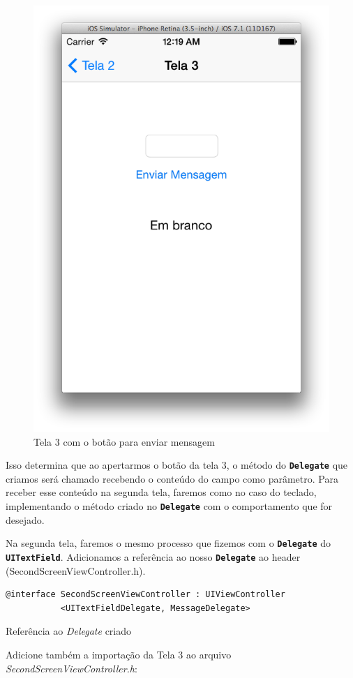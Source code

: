 \documentclass[a4paper,12pt,brazil,doubleside]{book}
\begin{document}
\begin{singlespace}
\bigskip
\bigskip

\begin{figure}[H]
  \centering
  \includegraphics[width=.55\textwidth]{figuras/3/tela_novo_projeto_49.png}
  \caption{Tela 3 com o botão para enviar mensagem}
  \label{fig:a}
\end{figure}


Isso determina que ao apertarmos o botão da tela 3, o método do \texttt{\textbf{Delegate}} que criamos será chamado recebendo o conteúdo do campo como parâmetro. Para receber esse conteúdo na segunda tela, faremos como no caso do teclado, implementando o método criado no \texttt{\textbf{Delegate}} com o comportamento que for desejado.

Na segunda tela, faremos o mesmo processo que fizemos com o \texttt{\textbf{Delegate}} do \texttt{\textbf{UITextField}}. Adicionamos a referência ao nosso \texttt{\textbf{Delegate}} ao header (SecondScreenViewController.h).\\

\begin{listing}[H]
\begin{verbatim}
@interface SecondScreenViewController : UIViewController
           <UITextFieldDelegate, MessageDelegate>
\end{verbatim}
\caption{Referência ao \emph{Delegate} criado}
\end{listing}


Adicione também a importação da Tela 3 ao arquivo \emph{SecondScreenViewController.h}:


\end{singlespace}
\end{document}
